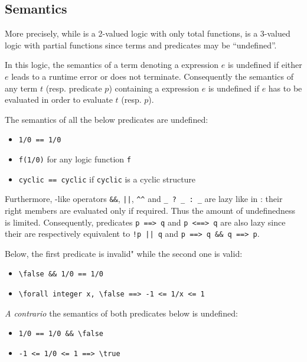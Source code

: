 
\subsection{Semantics}
\label{sec:twovaluedlogic}


More precisely, while \acsl is a 2-valued logic with only total
functions, \eacsl is a 3-valued logic with partial functions since
terms and predicates may be ``undefined''.

In this logic, the semantics of a term denoting a \C expression $e$ is undefined
if either $e$ leads to a runtime error or does not terminate. Consequently the
semantics of any term $t$ (resp. predicate $p$) containing a \C expression $e$
is undefined if $e$ has to be evaluated in order to evaluate $t$ (resp. $p$).
\begin{example}
The semantics of all the below predicates are undefined:
\begin{itemize}
\item \lstinline|1/0 == 1/0|
\item \lstinline|f(1/0)| for any logic function \lstinline|f|
\item \lstinline|cyclic == cyclic| if \lstinline|cyclic| is a cyclic \C
  structure
\end{itemize}
\end{example}

Furthermore, \C-like operators \lstinline|&&|, \lstinline+||+, \lstinline|^^|
and \lstinline|_ ? _ : _| are lazy like in \C: their right members are evaluated
only if required. Thus the amount of undefinedness is limited. Consequently,
predicates \lstinline|p ==> q| and \lstinline|p <==> q| are also lazy
since their are respectively equivalent to \lstinline+!p || q+ and
\lstinline|p ==> q && q ==> p|.

\begin{example}
Below, the first predicate is invalid" while the second one is valid:
\begin{itemize}
\item \lstinline|\false && 1/0 == 1/0|
\item \lstinline|\forall integer x, \false ==> -1 <= 1/x <= 1|
\end{itemize}

\emph{A contrario} the semantics of both predicates below is undefined:
\begin{itemize}
\item \lstinline|1/0 == 1/0 && \false|
\item \lstinline|-1 <= 1/0 <= 1 ==> \true|
\end{itemize}
\end{example}

